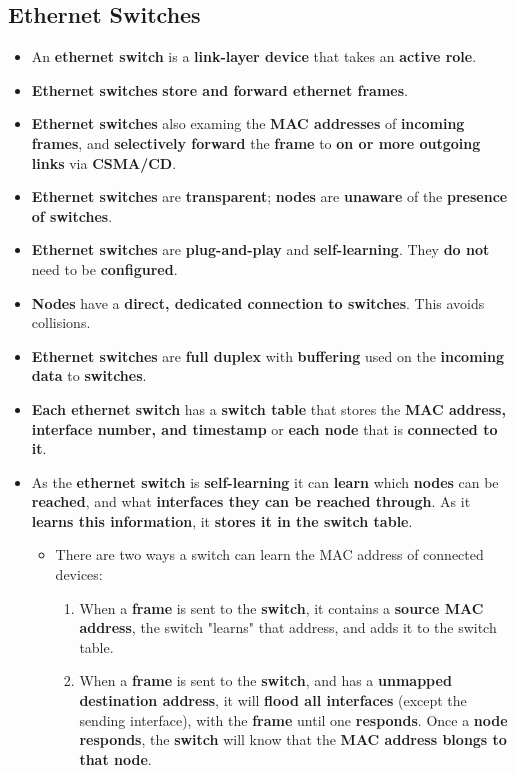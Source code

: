 \documentclass{article}
\begin{document}
    \subsection*{Ethernet Switches}
    \begin{itemize}
        \item An \textbf{ethernet switch} is a \textbf{link-layer device} that takes an \textbf{active role}.
        \item \textbf{Ethernet switches} \textbf{store and forward ethernet frames}.
        \item \textbf{Ethernet switches} also examing the \textbf{MAC addresses} of \textbf{incoming frames}, and \textbf{selectively forward} the \textbf{frame} to \textbf{on or more outgoing links} via \textbf{CSMA/CD}.
        \item \textbf{Ethernet switches} are \textbf{transparent}; \textbf{nodes} are \textbf{unaware} of the \textbf{presence of switches}.
        \item \textbf{Ethernet switches} are \textbf{plug-and-play} and \textbf{self-learning}. They \textbf{do not} need to be \textbf{configured}.
        \item \textbf{Nodes} have a \textbf{direct, dedicated connection to switches}. This avoids collisions.
        \item \textbf{Ethernet switches} are \textbf{full duplex} with \textbf{buffering} used on the \textbf{incoming data} to \textbf{switches}.
        \item \textbf{Each ethernet switch} has a \textbf{switch table} that stores the \textbf{MAC address, interface number, and timestamp} or \textbf{each node} that is \textbf{connected to it}.
        \item As the \textbf{ethernet switch} is \textbf{self-learning} it can \textbf{learn} which \textbf{nodes} can be \textbf{reached}, and what \textbf{interfaces they can be reached through}. As it \textbf{learns this information}, it \textbf{stores it in the switch table}.
        \begin{itemize}
            \item There are two ways a switch can learn the MAC address of connected devices:
            \begin{enumerate}
                \item When a \textbf{frame} is sent to the \textbf{switch}, it contains a \textbf{source MAC address}, the switch "learns" that address, and adds it to the switch table.
                \item When a \textbf{frame} is sent to the \textbf{switch}, and has a \textbf{unmapped destination address}, it will \textbf{flood all interfaces} (except the sending interface), with the \textbf{frame} until one \textbf{responds}. Once a \textbf{node responds}, the \textbf{switch} will know that the \textbf{MAC address blongs to that node}.
            \end{enumerate}
        \end{itemize}
    \end{itemize}
\end{document}
